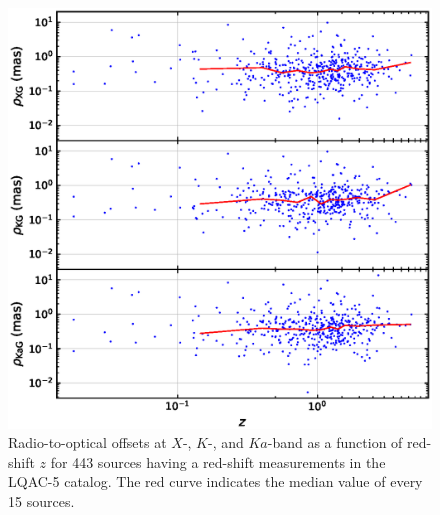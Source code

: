 \documentclass[referee]{aa}        %
\begin{document}

    \begin{figure}[hbtp]
        \centering
        \includegraphics[width=0.7\columnwidth]{figs/rho-z}
        \caption[]{\label{fig:rho-z}
            Radio-to-optical offsets at $X$-, $K$-, and $Ka$-band as a function of red-shift $z$ for 443 sources having a red-shift measurements in the LQAC-5 catalog.
            The red curve indicates the median value of every 15 sources.
        }
    \end{figure}

\end{document}

